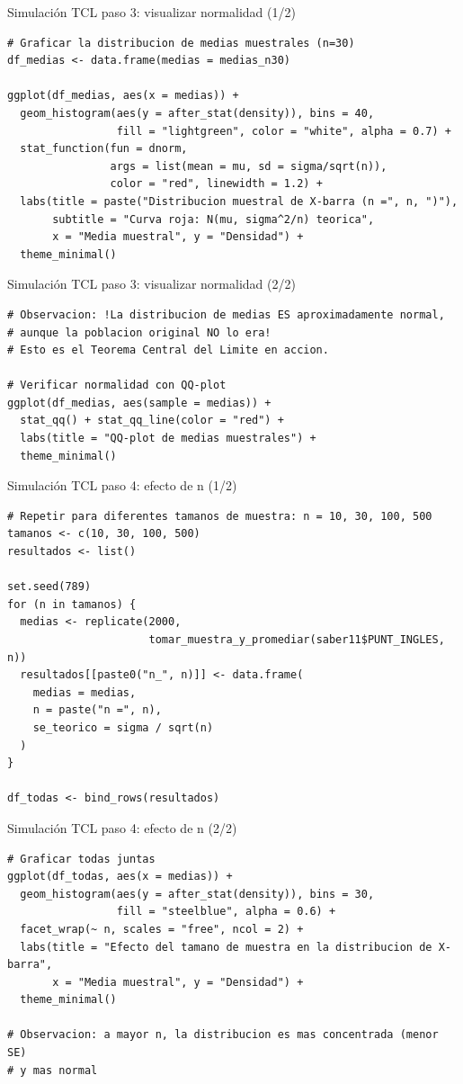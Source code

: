 \documentclass[aspectratio=169, 11pt]{beamer}
\begin{document}
\begin{frame}[fragile]{Simulación TCL paso 3: visualizar normalidad (1/2)}
\begin{lstlisting}
# Graficar la distribucion de medias muestrales (n=30)
df_medias <- data.frame(medias = medias_n30)

ggplot(df_medias, aes(x = medias)) +
  geom_histogram(aes(y = after_stat(density)), bins = 40,
                 fill = "lightgreen", color = "white", alpha = 0.7) +
  stat_function(fun = dnorm,
                args = list(mean = mu, sd = sigma/sqrt(n)),
                color = "red", linewidth = 1.2) +
  labs(title = paste("Distribucion muestral de X-barra (n =", n, ")"),
       subtitle = "Curva roja: N(mu, sigma^2/n) teorica",
       x = "Media muestral", y = "Densidad") +
  theme_minimal()
\end{lstlisting}
\end{frame}

\begin{frame}[fragile]{Simulación TCL paso 3: visualizar normalidad (2/2)}
\begin{lstlisting}
# Observacion: !La distribucion de medias ES aproximadamente normal,
# aunque la poblacion original NO lo era!
# Esto es el Teorema Central del Limite en accion.

# Verificar normalidad con QQ-plot
ggplot(df_medias, aes(sample = medias)) +
  stat_qq() + stat_qq_line(color = "red") +
  labs(title = "QQ-plot de medias muestrales") +
  theme_minimal()
\end{lstlisting}
\end{frame}

\begin{frame}[fragile]{Simulación TCL paso 4: efecto de n (1/2)}
\begin{lstlisting}
# Repetir para diferentes tamanos de muestra: n = 10, 30, 100, 500
tamanos <- c(10, 30, 100, 500)
resultados <- list()

set.seed(789)
for (n in tamanos) {
  medias <- replicate(2000,
                      tomar_muestra_y_promediar(saber11$PUNT_INGLES, n))
  resultados[[paste0("n_", n)]] <- data.frame(
    medias = medias,
    n = paste("n =", n),
    se_teorico = sigma / sqrt(n)
  )
}

df_todas <- bind_rows(resultados)
\end{lstlisting}
\end{frame}

\begin{frame}[fragile]{Simulación TCL paso 4: efecto de n (2/2)}
\begin{lstlisting}
# Graficar todas juntas
ggplot(df_todas, aes(x = medias)) +
  geom_histogram(aes(y = after_stat(density)), bins = 30,
                 fill = "steelblue", alpha = 0.6) +
  facet_wrap(~ n, scales = "free", ncol = 2) +
  labs(title = "Efecto del tamano de muestra en la distribucion de X-barra",
       x = "Media muestral", y = "Densidad") +
  theme_minimal()

# Observacion: a mayor n, la distribucion es mas concentrada (menor SE)
# y mas normal
\end{lstlisting}
\end{frame}
\end{document}
